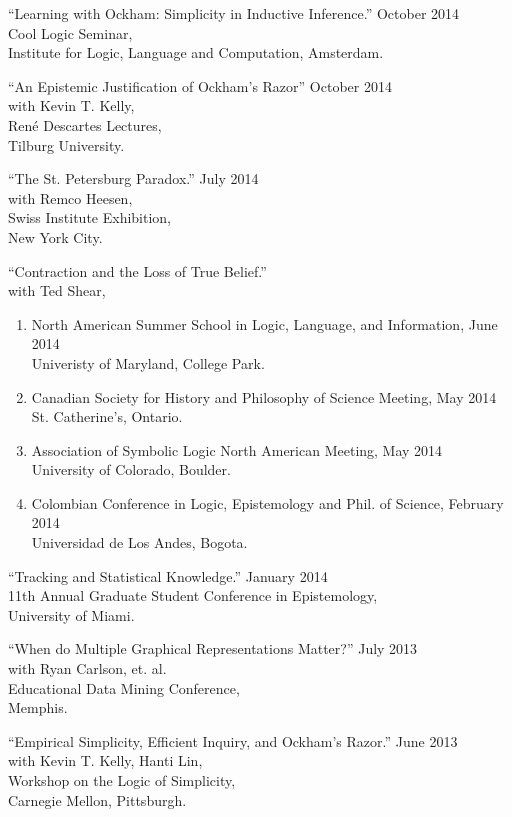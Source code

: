 \documentclass[12pt]{res} %
\begin{document}
\begin{resume}
``Learning with Ockham: Simplicity in Inductive Inference.'' \hfill October 2014\\
Cool Logic Seminar,\\ 
Institute for Logic, Language and Computation, Amsterdam.

``An Epistemic Justification of Ockham's Razor'' \hfill October 2014\\ with Kevin T. Kelly,\\ Ren\'{e} Descartes Lectures,\\
Tilburg University.

``The St. Petersburg Paradox.'' \hfill July 2014\\
with Remco Heesen,\\
Swiss Institute Exhibition,\\ 
New York City. 


``Contraction and the Loss of True Belief.'' \\
with Ted Shear,\\
\begin{enumerate}
\item North American Summer School in Logic, Language, and Information, \hfill June 2014\\ Univeristy of Maryland, College Park. 
\item Canadian Society for History and Philosophy of Science Meeting, \hfill May 2014\\ St. Catherine's, Ontario. 
\item Association of Symbolic Logic North American Meeting, \hfill May 2014\\ University of Colorado, Boulder. 
\item Colombian Conference in Logic, Epistemology and Phil. of Science, \hfill February 2014\\ Universidad de Los Andes, Bogota. 
\end{enumerate}

``Tracking and Statistical Knowledge.'' \hfill January 2014\\
 11th Annual Graduate Student Conference in Epistemology,\\
University of Miami. 


``When do Multiple Graphical Representations Matter?'' \hfill July 2013 \\
with Ryan Carlson, et. al.\\
 Educational Data Mining Conference,\\ Memphis. 

``Empirical Simplicity, Efficient Inquiry, and Ockham's Razor.'' \hfill June 2013\\
with Kevin T. Kelly, Hanti Lin,\\
 Workshop on the Logic of Simplicity,\\
Carnegie Mellon, Pittsburgh. 


\end{resume}
\end{document}
